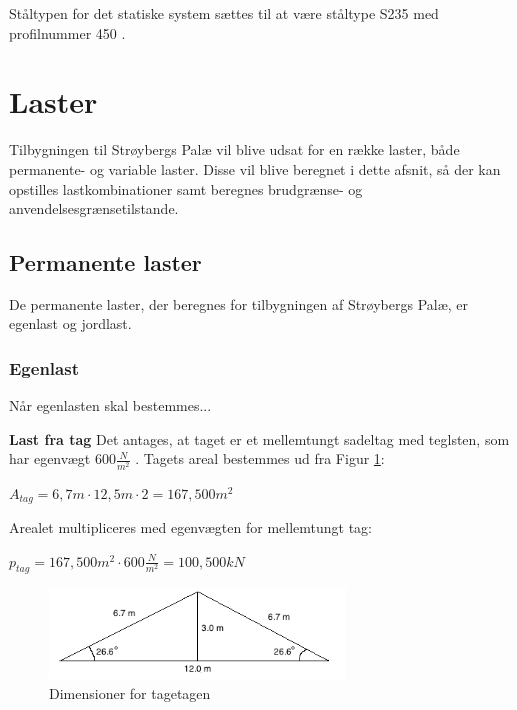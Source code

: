 Ståltypen for det statiske system sættes til at være ståltype S235 med profilnummer 450 \citep{stabi}.

\section{Laster}
Tilbygningen til Strøybergs Palæ vil blive udsat for en række laster, både permanente- og variable laster. Disse vil blive beregnet i dette afsnit, så der kan opstilles lastkombinationer samt beregnes brudgrænse- og anvendelsesgrænsetilstande.

\subsection{Permanente laster}
De permanente laster, der beregnes for tilbygningen af Strøybergs Palæ, er egenlast og jordlast.

\subsubsection{Egenlast}
Når egenlasten skal bestemmes...

\textbf{Last fra tag}
\newline
Det antages, at taget er et mellemtungt sadeltag med teglsten, som har egenvægt $600 \frac{N}{m^2}$ \citep{tag}.
\newline
\newline
Tagets areal bestemmes ud fra Figur \ref{fig:tagetage}:
\begin{center}
	$A_{tag} = 6,\!7 m\cdot 12,\!5 m \cdot 2=167,\!500 m^2$
\end{center}

Arealet multipliceres med egenvægten for mellemtungt tag:
\begin{center}
	$p_{tag} = 167,\!500 m^2\cdot 600 \frac{N}{m^2}=100,\!500 kN$
\end{center}

\begin{figure}[H]
	\centering
	\includegraphics[width=0.7\textwidth]{billeder/Tagmedvinkel.png}
	\caption{Dimensioner for tagetagen}
	\label{fig:tagetage}
\end{figure}

